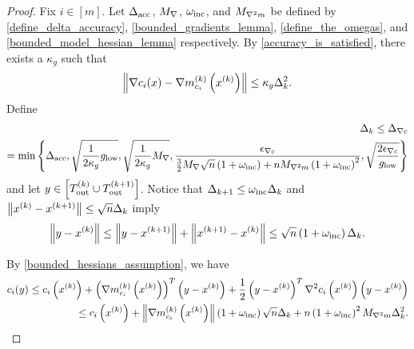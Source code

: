 \begin{proof}
Fix $i \in [m]$.
Let
${\Delta_{\textrm{acc}}}$,
${M_{\nabla}}$,
$\omega_{\text{inc}}$, 
and ${M_{\nabla^2 m}}$
be defined by
\cref{define_delta_accuracy},
\cref{bounded_gradients_lemma},
\cref{define_the_omegas},
and \cref{bounded_model_hessian_lemma}
respectively.
By \cref{accuracy_is_satisfied}, there exists a $\kappa_g$ such that
\begin{align}
\label{oszm_accuracy}
\left\|\nabla c_i(x) - {\nabla m_{c_i}^{(k)}\left(x^{(k)}\right)}\right\| \le \kappa_g \Delta_k^2.
\end{align}
Define
\begin{align}
\Delta_k \le {\Delta_{\nabla c}} \nonumber \\= \min\left\{
{\Delta_{\textrm{acc}}},
\sqrt{\frac 1 {2\kappa_g} { g_{\textrm{low}} }},
\sqrt{\frac 1 {2\kappa_g} {M_{\nabla}}},
\frac{{\epsilon_{\nabla c}}}{\frac 3 2 {M_{\nabla}}\sqrt{n}\left(1 + \omega_{\text{inc}}\right) + n {M_{\nabla^2 m}} \left(1 + \omega_{\text{inc}}\right)^2},
\sqrt{\frac{2{\epsilon_{\nabla c}}}{{ g_{\textrm{low}} }}}
\right\} \label{define_mingraddelta}
\end{align}
and let $y\in \left[{T_{\text{out}}^{(k)}} \cup {T_{\text{out}}^{(k+1)}}\right]$.
Notice that $\Delta_{k+1} \le \omega_{\text{inc}} \Delta_k$ and $\left\|x^{(k)} - {{x}^{(k+1)}}\right\| \le \sqrt{n}\Delta_k$ imply
\begin{align*}
\left\|y - x^{(k)}\right\| \le \left\|y - {{x}^{(k+1)}}\right\| + \left\|{{x}^{(k+1)}} - x^{(k)}\right\| \le \sqrt{n}\left(1 + \omega_{\text{inc}}\right)\Delta_k.
\end{align*}

By \cref{bounded_hessians_assumption}, we have
\begin{align}
c_i(y) \le c_i\left(x^{(k)}\right) + \left({\nabla m_{c_i}^{(k)}\left(x^{(k)}\right)}\right)^T\left(y - x^{(k)}\right) + \frac 1 2 \left(y - x^{(k)}\right)^T\nabla^2{c_i}\left(x^{(k)}\right)\left(y - x^{(k)}\right) \nonumber \\
\le c_i\left(x^{(k)}\right) + \left\|{\nabla m_{c_i}^{(k)}\left(x^{(k)}\right)}\right\|\left(1 + \omega_{\text{inc}}\right) \sqrt{n}\Delta_k +n \left(1 + \omega_{\text{inc}}\right)^2{M_{\nabla^2 m}}\Delta_k^2.
\label{oszm_first_bound}
\end{align}


\end{proof}
